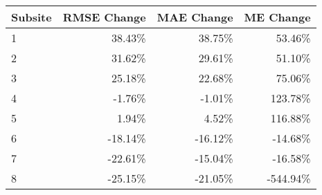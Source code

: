 \begin{tabular}{lrrr}
\toprule
Subsite &  RMSE Change & MAE Change & ME Change \\
\midrule
1 & 38.43\% & 38.75\% & 53.46\% \\
2 & 31.62\% & 29.61\% & 51.10\% \\
3 & 25.18\% & 22.68\% & 75.06\% \\
4 & -1.76\% & -1.01\% & 123.78\% \\
5 & 1.94\% & 4.52\% & 116.88\% \\
6 & -18.14\% & -16.12\% & -14.68\% \\
7 & -22.61\% & -15.04\% & -16.58\% \\
8 & -25.15\% & -21.05\% & -544.94\% \\
\bottomrule
\end{tabular}
